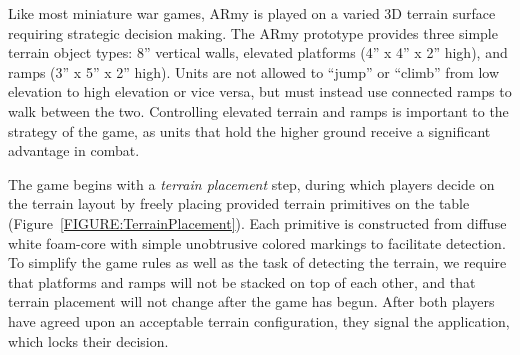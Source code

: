 \documentclass[review]{vgtc}                 %
\begin{document}


Like most miniature war games, ARmy is played on a varied 3D terrain
surface requiring strategic decision making. The ARmy prototype
provides three simple terrain object types: 8'' vertical walls,
elevated platforms (4'' x 4'' x 2'' high), and ramps (3'' x 5'' x 2'' high).
Units are not allowed to ``jump'' or ``climb'' from low elevation to
high elevation or vice versa, but must instead use connected ramps
to walk between the two.  Controlling elevated terrain and
ramps is important to the strategy of the game, as units that hold the
higher ground receive a significant advantage in combat.


The game begins with a \emph{terrain placement} step, during which
players decide on the terrain layout by freely placing provided
terrain primitives on the table
(Figure~\ref{FIGURE:TerrainPlacement}).  Each primitive is constructed
from diffuse white foam-core with simple unobtrusive colored markings
to facilitate detection.  To simplify the game rules as well as the
task of detecting the terrain, we require that platforms and ramps
will not be stacked on top of each other, and that terrain placement
will not change after the game has begun.  After both players have
agreed upon an acceptable terrain configuration, they 
signal the application, which locks their decision.
\end{document}
